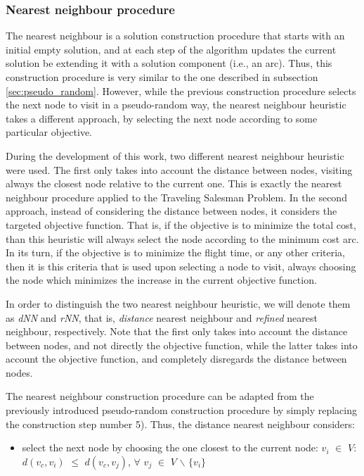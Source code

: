 \subsubsection{Nearest neighbour procedure}
\label{sec:nn}

The nearest neighbour is a solution construction procedure that starts with an initial empty solution, and at each step of the algorithm updates the current solution be extending it with a solution component (i.e., an arc). Thus, this construction procedure is very similar to the one described in subsection \ref{sec:pseudo_random}. However, while the previous construction procedure selects the next node to visit in a pseudo-random way, the nearest neighbour heuristic takes a different approach, by selecting the next node according to some particular objective.

During the development of this work, two different nearest neighbour heuristic were used. The first only takes into account the distance between nodes, visiting always the closest node relative to the current one. This is exactly the nearest neighbour procedure applied to the Traveling Salesman Problem. In the second approach, instead of considering the distance between nodes, it considers the targeted objective function. That is, if the objective is to minimize the total cost, than this heuristic will always select the node according to the minimum cost arc. In its turn, if the objective is to minimize the flight time, or any other criteria, then it is this criteria that is used upon selecting a node to visit, always choosing the node which minimizes the increase in the current objective function. 

In order to distinguish the two nearest neighbour heuristic, we will denote them as \textit{dNN} and \textit{rNN}, that is, \textit{distance} nearest neighbour and  \textit{refined} nearest neighbour, respectively. Note that the first only takes into account the distance between nodes, and not directly the objective function, while the latter takes into account the objective function, and completely disregards the distance between nodes.

The nearest neighbour construction procedure can be adapted from the previously introduced pseudo-random construction procedure by simply replacing the construction step number 5). Thus, the distance nearest neighbour considers:

\begin{itemize}
    \item select the next node by choosing the one closest to the current node: \newline
    $v_i$ $\in$ $V$: $d(v_c, v_i)$ $\leq$ $d(v_c, v_j)$,
    $\forall$ $v_j$ $\in$ $V$ $\backslash$ $\{v_i\}$   
\end{itemize}

